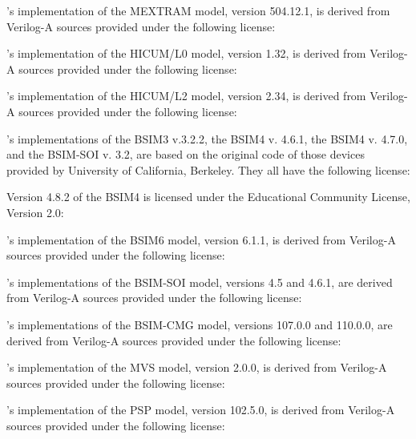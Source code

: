 \Xyce{}'s implementation of the MEXTRAM model, version 504.12.1, is derived
from Verilog-A sources provided under the following license:


\Xyce{}'s implementation of the HICUM/L0 model, version 1.32, is derived from
Verilog-A sources provided under the following license:


\Xyce{}'s implementation of the HICUM/L2 model, version 2.34, is derived from
Verilog-A sources provided under the following license:


\Xyce{}'s implementations of the BSIM3 v.3.2.2, the BSIM4 v. 4.6.1,
the BSIM4 v. 4.7.0, and the BSIM-SOI v. 3.2, are based on the original code of
those devices provided by University of California, Berkeley.  They all have
the following license:


Version 4.8.2 of the BSIM4 is licensed under the Educational Community License, Version 2.0:


\Xyce{}'s implementation of the BSIM6 model, version 6.1.1, is derived from
Verilog-A sources provided under the following license:


\Xyce{}'s implementations of the BSIM-SOI model, versions 4.5 and 4.6.1, are
derived from Verilog-A sources provided under the following license:


\Xyce{}'s implementations of the BSIM-CMG model, versions 107.0.0 and 110.0.0,
are derived from Verilog-A sources provided under the following license:


\Xyce{}'s implementation of the MVS model, version 2.0.0, is derived from
Verilog-A sources provided under the following license:


\Xyce{}'s implementation of the PSP model, version 102.5.0, is derived from
Verilog-A sources provided under the following license:


